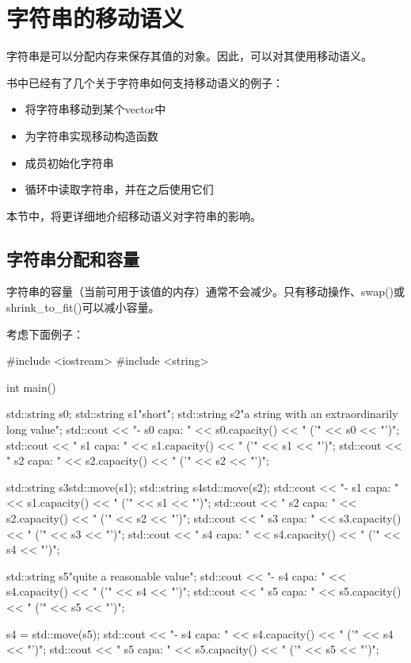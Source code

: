 \section{字符串的移动语义}
字符串是可以分配内存来保存其值的对象。因此，可以对其使用移动语义。

书中已经有了几个关于字符串如何支持移动语义的例子：

\begin{itemize}
	\item 将字符串移动到某个vector中
	\item 为字符串实现移动构造函数
	\item 成员初始化字符串
	\item 循环中读取字符串，并在之后使用它们
\end{itemize}

本节中，将更详细地介绍移动语义对字符串的影响。

\subsection{字符串分配和容量}

字符串的容量（当前可用于该值的内存）通常不会减少。只有移动操作、swap()或shrink_to_fit()可以减小容量。

考虑下面例子：

\begin{cppcode}
#include <iostream>
#include <string>

int main()
{
	std::string s0;
	std::string s1{"short"};
	std::string s2{"a string with an extraordinarily long value"};
	std::cout << "- s0 capa: " << s0.capacity() << " ('" << s0 << "')\n";
	std::cout << " s1 capa: " << s1.capacity() << " ('" << s1 << "')\n";
	std::cout << " s2 capa: " << s2.capacity() << " ('" << s2 << "')\n";

	std::string s3{std::move(s1)};
	std::string s4{std::move(s2)};
	std::cout << "- s1 capa: " << s1.capacity() << " ('" << s1 << "')\n";
	std::cout << " s2 capa: " << s2.capacity() << " ('" << s2 << "')\n";
	std::cout << " s3 capa: " << s3.capacity() << " ('" << s3 << "')\n";
	std::cout << " s4 capa: " << s4.capacity() << " ('" << s4 << "')\n";

	std::string s5{"quite a reasonable value"};
	std::cout << "- s4 capa: " << s4.capacity() << " ('" << s4 << "')\n";
	std::cout << " s5 capa: " << s5.capacity() << " ('" << s5 << "')\n";

	s4 = std::move(s5);
	std::cout << "- s4 capa: " << s4.capacity() << " ('" << s4 << "')\n";
	std::cout << " s5 capa: " << s5.capacity() << " ('" << s5 << "')\n";
}
\end{cppcode}

